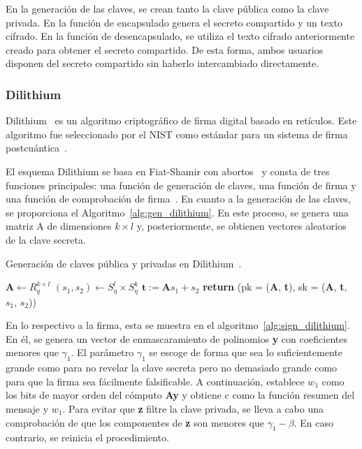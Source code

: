 En la generación de las claves, se crean tanto la clave pública como la clave privada.
En la función de encapsulado genera el secreto compartido y un texto cifrado.
En la función de desencapsulado, se utiliza el texto cifrado anteriormente creado para obtener el secreto compartido.
De esta forma, ambos usuarios disponen del secreto compartido sin haberlo intercambiado directamente.



\subsubsection{Dilithium}\label{subsubsec:dilithium}

Dilithium~\cite{dilithium} es un algoritmo criptográfico de firma digital basado en retículos.
Este algoritmo fue seleccionado por el \ac{NIST} como estándar para un sistema de firma postcuántica~\cite{nist_sel}.

El esquema Dilithium se basa en Fiat-Shamir con abortos~\cite{10.1007/978-3-642-10366-7_35} y consta de tres funciones principales: una función de generación de claves, una función de firma y una función de comprobación de firma~\cite{dilithium_spec}.
En cuanto a la generación de las claves, se proporciona el Algoritmo~\ref{alg:gen_dilithium}.
En este proceso, se genera una matriz A de dimensiones $k \times l$ y, posteriormente, se obtienen vectores aleatorios de la clave secreta.

\begin{algorithm}
    \caption{Generación de claves pública y privadas en Dilithium~\cite{dilithium_spec}.}
    \label{alg:gen_dilithium}
    \hspace{2mm}$\textbf{A} \gets R_q^{k\times l}$\newline
    $(s_1,s_2) \gets S_\eta^l \times S_\eta^{k}$\newline
    $\textbf{t} := \textbf{A}s_1 + s_2$\newline
    \textbf{return} (pk = (\textbf{A}, \textbf{t}), sk = (\textbf{A}, \textbf{t}, $s_1$, $s_2$))
\end{algorithm}

En lo respectivo a la firma, esta se muestra en el algoritmo~\ref{alg:sign_dilithium}.
En él, se genera un vector de enmascaramiento de polinomios \textbf{y} con coeficientes menores que $\gamma_1$.
El parámetro $\gamma_1$ se escoge de forma que sea lo suficientemente grande como para no revelar la clave secreta pero no demasiado grande como para que la firma sea fácilmente falsificable.
A continuación, establece $w_1$ como los bits de mayor orden del cómputo \textbf{Ay} y obtiene c como la función resumen del mensaje y $w_1$.
Para evitar que \textbf{z} filtre la clave privada, se lleva a cabo una comprobación de que los componentes de \textbf{z} son menores que $\gamma_1 - \beta$.
En caso contrario, se reinicia el procedimiento.

